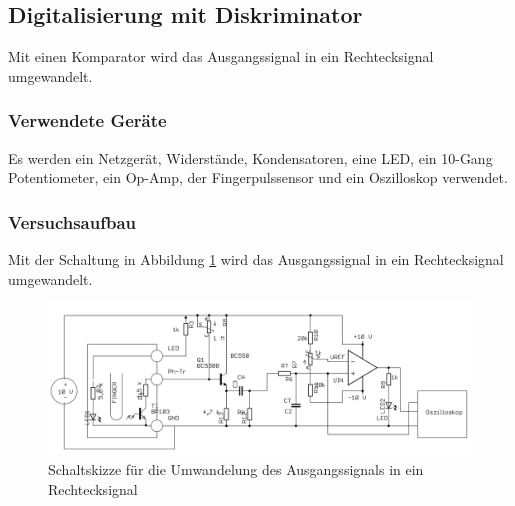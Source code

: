\documentclass[12pt,a4paper]{article}
\begin{document}
\subsection{Digitalisierung mit Diskriminator}

Mit einen Komparator wird das Ausgangssignal in ein Rechtecksignal umgewandelt.

\subsubsection*{Verwendete Geräte}

Es werden ein Netzgerät, Widerstände, Kondensatoren, eine LED, ein 10-Gang Potentiometer, ein Op-Amp, der Fingerpulssensor und ein Oszilloskop verwendet.

\subsubsection*{Versuchsaufbau}

Mit der Schaltung in Abbildung \ref{fig:auf_4} wird das Ausgangssignal in ein Rechtecksignal umgewandelt.

\begin{figure}[H] 
	\centering
	\includegraphics[scale = 0.3]{auf_4.png}
	\caption[Schaltskizze für die Umwandelung des Ausgangssignals in ein Rechtecksignal]{Schaltskizze für die Umwandelung des Ausgangssignals in ein Rechtecksignal\footnotemark}
	\label{fig:auf_4}
\end{figure}
\end{document}
